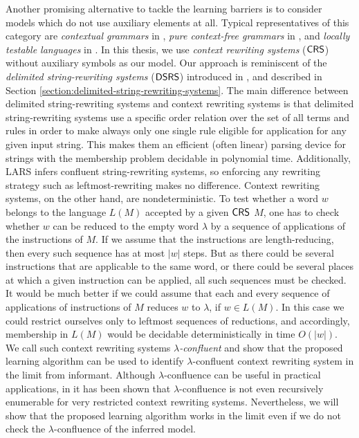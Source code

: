 Another promising alternative to tackle the learning barriers is to consider models which do not use auxiliary elements at all. Typical representatives of this category are \emph{contextual grammars} in \cite{M69}, \emph{pure context-free grammars} in \cite{maurer1980pure}, and \emph{locally testable languages} in \cite{MR74,Zal72}. In this thesis, we use \emph{context rewriting systems} ($\textup{\sf CRS\/}$) without auxiliary symbols as our model. Our approach is reminiscent of the \emph{delimited string-rewriting systems} ($\textup{\sf DSRS}$) introduced in \cite{Eyraud2007}, and described in Section \ref{section:delimited-string-rewriting-systems}. The main difference between delimited string-rewriting systems and context rewriting systems is that delimited string-rewriting systems use a specific order relation over the set of all terms and rules in order to make always only one single rule eligible for application for any given input string. This makes them an efficient (often linear) parsing device for strings with the membership problem decidable in polynomial time. Additionally, LARS \cite{delaHiguera2010} infers confluent string-rewriting systems, so enforcing any rewriting strategy such as leftmost-rewriting makes no difference. Context rewriting systems, on the other hand, are nondeterministic. To test whether a word $w$ belongs to the language $L(M)$ accepted by a given $\textup{\sf CRS\/}$ $M$, one has to check whether $w$ can be reduced to the empty word $\lambda$ by a sequence of applications of the instructions of $M$. If we assume that the instructions are length-reducing, then every such sequence has at most $|w|$ steps. But as there could be several instructions that are applicable to the same word, or there could be several places at which a given instruction can be applied, all such sequences must be checked. It would be much better if we could assume that each and every sequence of applications of instructions of $M$ reduces $w$ to $\lambda$, if $w \in L(M)$. In this case we could restrict ourselves only to leftmost sequences of reductions, and accordingly, membership in $L(M)$ would be decidable deterministically in time $O(|w|)$. We call such context rewriting systems \emph{$\lambda$-confluent} and show that the proposed learning algorithm can be used to identify $\lambda$-confluent context rewriting system in the limit from informant. Although $\lambda$-confluence can be useful in practical applications, in \cite{OM15} it has been shown that $\lambda$-confluence is not even recursively enumerable for very restricted context rewriting systems. Nevertheless, we will show that the proposed learning algorithm works in the limit even if we do not check the $\lambda$-confluence of the inferred model.

